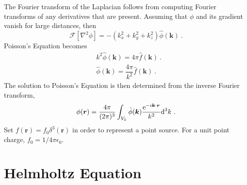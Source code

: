 \documentclass[11pt,a4paper]{article}
\renewcommand{\vec}[1]{\boldsymbol{#1}}
\newcommand{\dif}{\mathrm{d}}
\begin{document}
The Fourier transform of the Laplacian follows from computing Fourier transforms of any derivatives that are present. Assuming that $\phi$ and its gradient vanish for large distances, then
\begin{equation}
\mathcal F[\nabla^2 \phi] = -(k_x^2 +k_y^2 +k_z^2) \hat{\phi}(\vec{k}) ~.
\end{equation}
Poisson's Equation becomes
\begin{align}
& k^2 \hat{\phi}(\vec{k}) = 4\pi \hat{f}(\vec{k}) ~.\\
& \hat{\phi}(\vec{k}) = \dfrac{4\pi}{k^2}  \hat{f}(\vec{k}) ~.
\end{align}
The solution to Poisson's Equation is then determined from the inverse Fourier transform,
\begin{equation}
\phi(\vec{r}) = \dfrac{4\pi}{(2\pi)^3} \int_{V_k} \hat{\phi}(\vec{k})\dfrac{{\rm e}^{-i\vec{k}\cdot \vec{r}}}{k^2} \dif^3 k ~.
\end{equation}
Set $f(\vec{r}) = f_0 \delta^3(\vec{r})$ in order to represent a point source. For a unit point charge, $f_0 = 1/4\pi \epsilon_0$.


\cite{Rother:2256622} 



























































\section{Helmholtz Equation}
\end{document}
